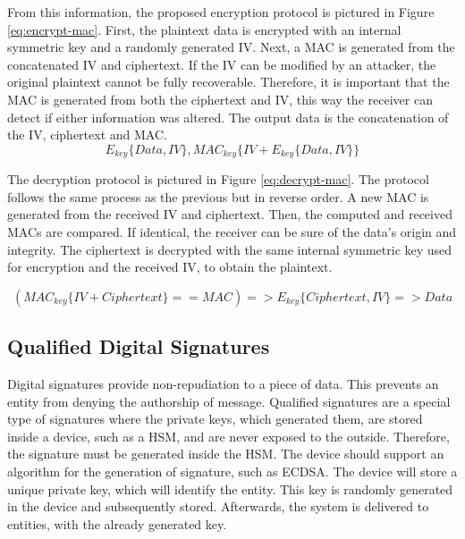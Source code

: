 From this information, the proposed encryption protocol is pictured in Figure \ref{eq:encrypt-mac}. First, the plaintext data is encrypted with an internal symmetric key and a randomly generated IV. Next, a MAC is generated from the concatenated IV and ciphertext.
If the IV can be modified by an attacker, the original plaintext cannot be fully recoverable. Therefore, it is important that the MAC is generated from both the ciphertext and IV, this way the receiver can detect if either information was altered.
The output data is the concatenation of the IV, ciphertext and MAC.
\begin{equation}
	\label{eq:encrypt-mac}
	E_{key}\{Data, IV\}, MAC_{key}\{IV+E_{key}\{Data, IV\}\}
\end{equation}

The decryption protocol is pictured in Figure \ref{eq:decrypt-mac}. The protocol follows the same process as the previous but in reverse order. A new MAC is generated from the received IV and ciphertext. Then, the computed and received MACs are compared. If identical, the receiver can be sure of the data's origin and integrity. The ciphertext is decrypted with the same internal symmetric key used for encryption and the received IV, to obtain the plaintext.

\begin{equation}
	\label{eq:decrypt-mac}
	(MAC_{key}\{IV+Ciphertext\} == MAC) => E_{key}\{Ciphertext, IV\} => Data
\end{equation}

\subsection{Qualified Digital Signatures}\label{chap:arch:services:signatures}

Digital signatures provide non-repudiation to a piece of data. This prevents an entity from denying the authorship of message. Qualified signatures are a special type of signatures where the private keys, which generated them, are stored inside a device, such as a HSM, and are never exposed to the outside.
Therefore, the signature must be generated inside the HSM. The device should support an algorithm for the generation of signature, such as ECDSA.
The device will store a unique private key, which will identify the entity. This key is randomly generated in the device and subsequently stored. Afterwards, the system is delivered to entities, with the already generated key.

